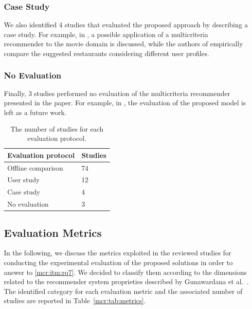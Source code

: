 \subsubsection{Case Study}

We also identified 4 studies that evaluated the proposed approach by describing a case study. For example, in , a possible application of a multicriteria recommender to the movie domain is discussed, while the authors of  empirically compare the suggested restaurants considering different user profiles.

\subsubsection{No Evaluation}

Finally, 3 studies performed no evaluation of the multicriteria recommender presented in the paper. For example, in , the evaluation of the proposed model is left as a future work.

\begin{table}
\centering
\begin{tabular}{@{}ll@{}}
\toprule
Evaluation protocol & Studies \\ \midrule
Offline comparison  & 74      \\
User study          & 12      \\
Case study          & 4       \\
No evaluation       & 3       \\ \bottomrule
\end{tabular}
\caption[Studies per evaluation protocol]{The number of studies for each evaluation protocol.}
\label{mcr:tab:protocols}
\end{table}

\subsection{Evaluation Metrics}
\label{mcr:sec:metrics}

In the following, we discuss the metrics exploited in the reviewed studies for conducting the experimental evaluation of the proposed solutions in order to answer to \ref{mcr:itm:rq7}. We decided to classify them according to the dimensions related to the recommender system proprieties described by Gunawardana et al.~\cite{Gunawardana2015}. The identified category for each evaluation metric and the associated number of studies are reported in Table~\ref{mcr:tab:metrics}.

